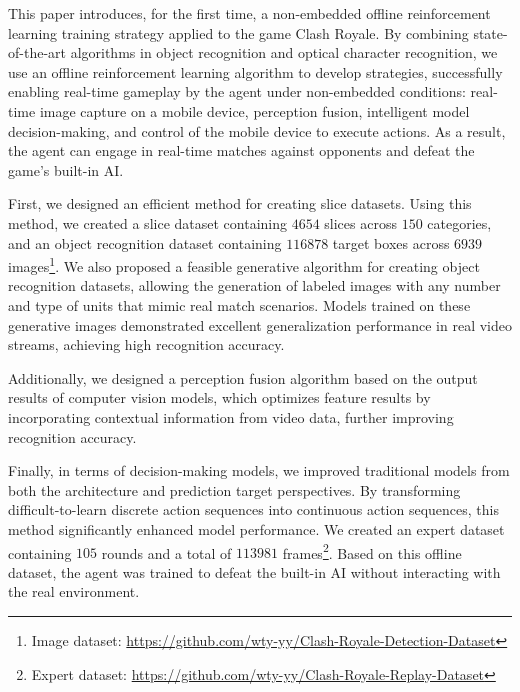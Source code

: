 \titlespacing{\chapter}{0pt}{0mm}{5mm}

\noindent This paper introduces, for the first time, a non-embedded offline reinforcement learning training strategy applied to the game Clash Royale. By combining state-of-the-art algorithms in object recognition and optical character recognition, we use an offline reinforcement learning algorithm to develop strategies, successfully enabling real-time gameplay by the agent under non-embedded conditions: real-time image capture on a mobile device, perception fusion, intelligent model decision-making, and control of the mobile device to execute actions. As a result, the agent can engage in real-time matches against opponents and defeat the game's built-in AI.

\noindent First, we designed an efficient method for creating slice datasets. Using this method, we created a slice dataset containing $4654$ slices across $150$ categories, and an object recognition dataset containing $116878$ target boxes across $6939$ images\footnote{Image dataset: \url{https://github.com/wty-yy/Clash-Royale-Detection-Dataset}\hfill}. We also proposed a feasible generative algorithm for creating object recognition datasets, allowing the generation of labeled images with any number and type of units that mimic real match scenarios. Models trained on these generative images demonstrated excellent generalization performance in real video streams, achieving high recognition accuracy.

\noindent Additionally, we designed a perception fusion algorithm based on the output results of computer vision models, which optimizes feature results by incorporating contextual information from video data, further improving recognition accuracy.

\noindent Finally, in terms of decision-making models, we improved traditional models from both the architecture and prediction target perspectives. By transforming difficult-to-learn discrete action sequences into continuous action sequences, this method significantly enhanced model performance. We created an expert dataset containing $105$ rounds and a total of $113981$ frames\footnote{Expert dataset: \url{https://github.com/wty-yy/Clash-Royale-Replay-Dataset}\hfill}. Based on this offline dataset, the agent was trained to defeat the built-in AI without interacting with the real environment.

